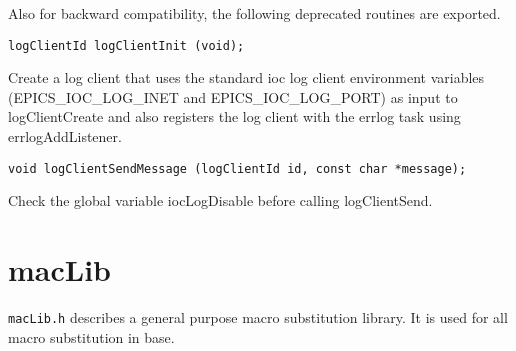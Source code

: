 Also for backward compatibility, the following deprecated routines are exported.

\begin{verbatim}
logClientId logClientInit (void);
\end{verbatim}

   Create a log client that uses the standard ioc log client environment variables (EPICS\_IOC\_LOG\_INET and 
EPICS\_IOC\_LOG\_PORT) as input to logClientCreate and also registers the log client with the errlog task using 
errlogAddListener.

\begin{verbatim}
void logClientSendMessage (logClientId id, const char *message);
\end{verbatim}

    Check the global variable iocLogDisable before calling logClientSend.

\section{macLib}

\verb|macLib.h| describes a general purpose macro substitution library. It is used for all macro substitution in base.

